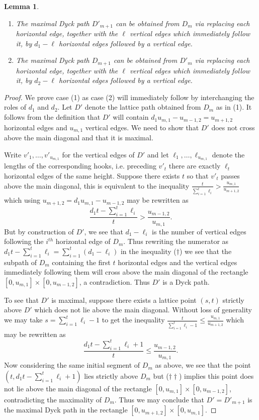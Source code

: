 \documentclass{amsart}
\newtheorem{lemma}[theorem]{Lemma}
\begin{document}
\begin{lemma}\label{le:Dyck path recursion}\mbox{}
  \begin{enumerate}
    \item The maximal Dyck path $D'_{m+1}$ can be obtained from $D_m$ via replacing each horizontal edge, together with the $\ell$ vertical edges which immediately follow it, by $d_1-\ell$ horizontal edges followed by a vertical edge.
    \item The maximal Dyck path $D_{m+1}$ can be obtained from $D'_m$ via replacing each horizontal edge, together with the $\ell$ vertical edges which immediately follow it, by $d_2-\ell$ horizontal edges followed by a vertical edge.
  \end{enumerate}
\end{lemma}
\begin{proof}
  We prove case (1) as case (2) will immediately follow by interchanging the roles of $d_1$ and $d_2$.  Let $D'$ denote the lattice path obtained from $D_m$ as in (1).  It follows from the definition that $D'$ will contain $d_1u_{m,1}-u_{m-1,2}=u_{m+1,2}$ horizontal edges and $u_{m,1}$ vertical edges.  We need to show that $D'$ does not cross above the main diagonal and that it is maximal.  

  Write $v'_1,\ldots,v'_{u_{m,1}}$ for the vertical edges of $D'$ and let $\ell_1,\ldots,\ell_{u_{m,1}}$ denote the lengths of the corresponding hooks, i.e. preceding $v'_t$ there are exactly $\ell_t$ horizontal edges of the same height.  Suppose there exists $t$ so that $v'_t$ passes above the main diagonal, this is equivalent to the inequality $\frac{t}{\sum\limits_{i=1}^t\ell_i}>\frac{u_{m,1}}{u_{m+1,2}}$ which using $u_{m+1,2}=d_1u_{m,1}-u_{m-1,2}$ may be rewritten as 
  \[\tag{$\dagger$}\frac{d_1t-\sum\limits_{i=1}^t\ell_i}{t}>\frac{u_{m-1,2}}{u_{m,1}}.\]
  But by construction of $D'$, we see that $d_1-\ell_i$ is the number of vertical edges following the $i^{th}$ horizontal edge of $D_m$.  Thus rewriting the numerator as $d_1t-\sum\limits_{i=1}^t\ell_i=\sum\limits_{i=1}^t(d_1-\ell_i)$ in the inequality ($\dagger$) we see that the subpath of $D_m$ containing the first $t$ horizontal edges and the vertical edges immediately following them will cross above the main diagonal of the rectangle $[0,u_{m,1}]\times[0,u_{m-1,2}]$, a contradiction.  Thus $D'$ is a Dyck path.

  To see that $D'$ is maximal, suppose there exists a lattice point $(s,t)$ strictly above $D'$ which does not lie above the main diagonal.  Without loss of generality we may take $s=\sum\limits_{i=1}^t\ell_i-1$ to get the inequality $\frac{t}{\sum\limits_{i=1}^t\ell_i-1}\le\frac{u_{m,1}}{u_{m+1,2}}$ which may be rewritten as
  \[\tag{$\dagger\dagger$}\frac{d_1t-\sum\limits_{i=1}^t\ell_i+1}{t}\le\frac{u_{m-1,2}}{u_{m,1}}.\]
  Now considering the same initial segment of $D_m$ as above, we see that the point $(t,d_1t-\sum\limits_{i=1}^t\ell_i+1)$ lies strictly above $D_m$ but ($\dagger\dagger$) implies this point does not lie above the main diagonal of the rectangle $[0,u_{m,1}]\times[0,u_{m-1,2}]$, contradicting the maximality of $D_m$.  Thus we may conclude that $D'=D'_{m+1}$ is the maximal Dyck path in the rectangle $[0,u_{m+1,2}]\times[0,u_{m,1}]$.
\end{proof}
\end{document}
